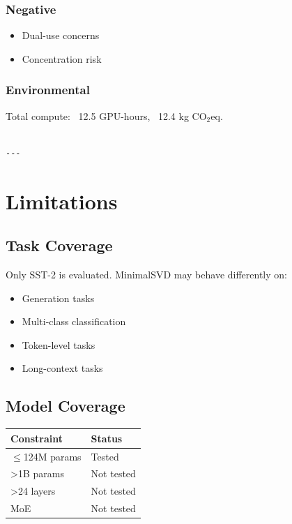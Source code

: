 \subsubsection{Negative}
\begin{itemize}
\item Dual-use concerns
\item Concentration risk

\end{itemize}
\subsubsection{Environmental}
Total compute: ~12.5 GPU-hours, ~12.4 kg CO$_2$eq.
\begin{lstlisting}

---
\end{lstlisting}


\section{Limitations}

\subsection{Task Coverage}

Only SST-2 is evaluated. MinimalSVD may behave differently on:
\begin{itemize}
\item Generation tasks
\item Multi-class classification
\item Token-level tasks
\item Long-context tasks

\end{itemize}
\subsection{Model Coverage}

\begin{table}[H]
\centering
\small
\begin{tabular}{ll}
\toprule
\textbf{Constraint} & \textbf{Status} \\
\midrule
$\le$124M params & Tested \\
\textgreater{}1B params & Not tested \\
\textgreater{}24 layers & Not tested \\
MoE & Not tested \\
\bottomrule
\end{tabular}
\end{table}

